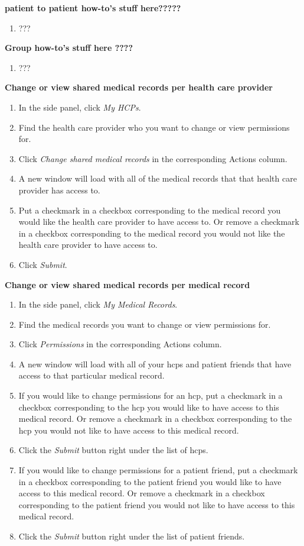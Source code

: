 \textbf{patient to patient how-to's stuff here?????}
\begin{enumerate}
\item ???
\end{enumerate}
\textbf{Group how-to's stuff here ????}
\begin{enumerate}
\item ???
\end{enumerate}
\textbf{Change or view shared medical records per health care provider}
\begin{enumerate}
\item In the side panel, click \textit{My HCPs}.
\item Find the health care provider who you want to change or view permissions for.
\item Click \textit{Change shared medical records} in the corresponding Actions column.
\item A new window will load with all of the medical records that that health care provider has access to.
\item Put a checkmark in a checkbox corresponding to the medical record you would like the health care provider to have access to. Or remove a checkmark in a checkbox corresponding to the medical record you would not like the health care provider to have access to.
\item Click \textit{Submit}.
\end{enumerate}
\textbf{Change or view shared medical records per medical record}
\begin{enumerate}
\item In the side panel, click \textit{My Medical Records}.
\item Find the medical records you want to change or view permissions for.
\item Click \textit{Permissions} in the corresponding Actions column.
\item A new window will load with all of your hcps and patient friends that have access to that particular medical record.
\item If you would like to change permissions for an hcp, put a checkmark in a checkbox corresponding to the hcp you would like to have access to this medical record. Or remove a checkmark in a checkbox corresponding to the hcp you would not like to have access to this medical record.
\item Click the \textit{Submit} button right under the list of hcps.
\item If you would like to change permissions for a patient friend, put a checkmark in a checkbox corresponding to the patient friend you would like to have access to this medical record. Or remove a checkmark in a checkbox corresponding to the patient friend you would not like to have access to this medical record.
\item Click the \textit{Submit} button right under the list of patient friends.
\end{enumerate}
